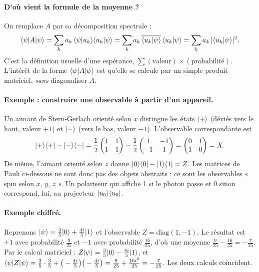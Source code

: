 \paragraph{D'où vient la formule de la moyenne ?} On remplace $A$ par sa décomposition spectrale :
\[
\langle \psi\rvert A\lvert \psi\rangle=\sum_ka_k\,\langle \psi\vert u_k\rangle\langle u_k\vert \psi\rangle=\sum_ka_k\,\overline{\langle u_k\vert \psi\rangle}\,\langle u_k\vert \psi\rangle=\sum_ka_k\,|\langle u_k\vert \psi\rangle|^2 .
\]
C'est la définition usuelle d'une espérance, $\sum(\text{valeur})\times(\text{probabilité})$. L'intérêt de la forme $\langle \psi\rvert A\lvert \psi\rangle$ est qu'elle se calcule par un simple produit matriciel, \emph{sans} diagonaliser $A$.

\paragraph{Exemple : construire une observable à partir d'un appareil.} Un aimant de Stern-Gerlach orienté selon $x$ distingue les états $\lvert +\rangle$ (déviés vers le haut, valeur $+1$) et $\lvert -\rangle$ (vers le bas, valeur $-1$). L'observable correspondante est
\[
\lvert +\rangle\langle +\rvert-\lvert -\rangle\langle -\rvert=\frac12\begin{pmatrix}1&1\\1&1\end{pmatrix}-\frac12\begin{pmatrix}1&-1\\-1&1\end{pmatrix}=\begin{pmatrix}0&1\\1&0\end{pmatrix}=X .
\]
De même, l'aimant orienté selon $z$ donne $\lvert 0\rangle\langle 0\rvert-\lvert 1\rangle\langle 1\rvert=Z$. Les matrices de Pauli ci-dessous ne sont donc pas des objets abstraits : ce sont les observables « spin selon $x$, $y$, $z$ ». Un polariseur qui affiche 1 si le photon passe et 0 sinon correspond, lui, au projecteur $\lvert u_0\rangle\langle u_0\rvert$.

\paragraph{Exemple chiffré.} Reprenons $\lvert \psi\rangle=\tfrac35\lvert 0\rangle+\tfrac{4i}5\lvert 1\rangle$ et l'observable $Z=\mathrm{diag}(1,-1)$. Le résultat est $+1$ avec probabilité $\tfrac9{25}$ et $-1$ avec probabilité $\tfrac{16}{25}$, d'où une moyenne $\tfrac9{25}-\tfrac{16}{25}=-\tfrac7{25}$. Par le calcul matriciel : $Z\lvert \psi\rangle=\tfrac35\lvert 0\rangle-\tfrac{4i}5\lvert 1\rangle$, et $\langle \psi\rvert Z\lvert \psi\rangle=\tfrac35\cdot\tfrac35+\big(-\tfrac{4i}5\big)\big(-\tfrac{4i}5\big)=\tfrac9{25}+\tfrac{16i^2}{25}=-\tfrac7{25}$. Les deux calculs coïncident.

